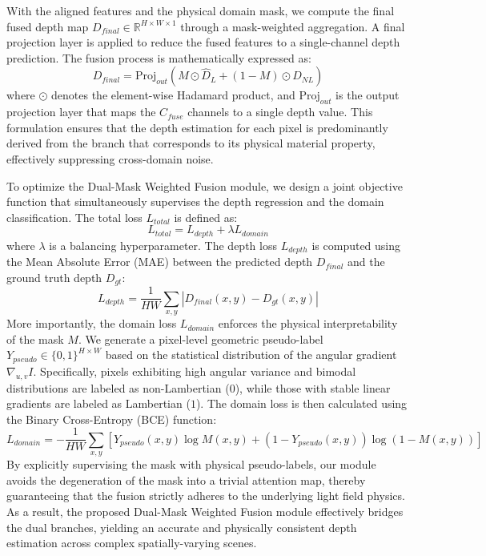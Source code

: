 With the aligned features and the physical domain mask, we compute the final fused depth map $D_{final} \in \mathbb{R}^{H \times W \times 1}$ through a mask-weighted aggregation. A final projection layer is applied to reduce the fused features to a single-channel depth prediction. The fusion process is mathematically expressed as:
\begin{equation}
\label{eq:eq18}
D_{final} = \text{Proj}_{out} \left( M \odot \hat{D}_L + (1 - M) \odot \hat{D}_{NL} \right)
\end{equation}
where $\odot$ denotes the element-wise Hadamard product, and $\text{Proj}_{out}$ is the output projection layer that maps the $C_{fuse}$ channels to a single depth value. This formulation ensures that the depth estimation for each pixel is predominantly derived from the branch that corresponds to its physical material property, effectively suppressing cross-domain noise.

To optimize the Dual-Mask Weighted Fusion module, we design a joint objective function that simultaneously supervises the depth regression and the domain classification. The total loss $L_{total}$ is defined as:
\begin{equation}
\label{eq:eq19}
L_{total} = L_{depth} + \lambda L_{domain}
\end{equation}
where $\lambda$ is a balancing hyperparameter. The depth loss $L_{depth}$ is computed using the Mean Absolute Error (MAE) between the predicted depth $D_{final}$ and the ground truth depth $D_{gt}$:
\begin{equation}
\label{eq:eq20}
L_{depth} = \frac{1}{HW} \sum_{x,y} \left| D_{final}(x,y) - D_{gt}(x,y) \right|
\end{equation}
More importantly, the domain loss $L_{domain}$ enforces the physical interpretability of the mask $M$. We generate a pixel-level geometric pseudo-label $Y_{pseudo} \in \{0, 1\}^{H \times W}$ based on the statistical distribution of the angular gradient $\nabla_{u,v} I$. Specifically, pixels exhibiting high angular variance and bimodal distributions are labeled as non-Lambertian ($0$), while those with stable linear gradients are labeled as Lambertian ($1$). The domain loss is then calculated using the Binary Cross-Entropy (BCE) function:
\begin{equation}
\label{eq:eq21}
L_{domain} = - \frac{1}{HW} \sum_{x,y} \left[ Y_{pseudo}(x,y) \log M(x,y) + (1 - Y_{pseudo}(x,y)) \log (1 - M(x,y)) \right]
\end{equation}
By explicitly supervising the mask with physical pseudo-labels, our module avoids the degeneration of the mask into a trivial attention map, thereby guaranteeing that the fusion strictly adheres to the underlying light field physics. As a result, the proposed Dual-Mask Weighted Fusion module effectively bridges the dual branches, yielding an accurate and physically consistent depth estimation across complex spatially-varying scenes.

